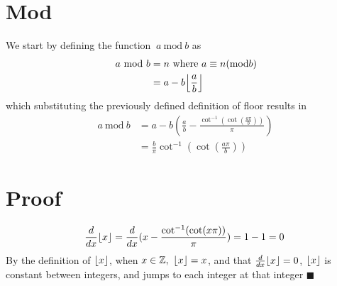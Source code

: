 \documentclass[11pt]{article}
\DeclarePairedDelimiter\floor{\lfloor}{\rfloor}
\newcommand{\Mod}[2]{\ #1\ \mathrm{mod}\ #2}
\newcommand{\fractionalAlg}{\frac{\cot^{\mathrm{-1}}(\cot(x\pi))}{\pi}}
\begin{document}
\section{Mod}
We start by defining the function \(\Mod{a}{b}\) as
\begin{align*}
\Mod{a}{b} &=n \textrm{ where } a \equiv n (\textrm{mod} b)\\
&=a-b\floor*{\frac{a}{b}}
\end{align*}
which substituting the previously defined definition of floor results in
\begin{equation*}
\begin{split}
\Mod{a}{b}&=a-b(\frac{a}{b}-\frac{\cot^{\mathrm{-1}}(\cot(\frac{a\pi}{b}))}{\pi})
\\&=\frac{b}{\pi}\cot^{\mathrm{-1}}(\cot(\frac{a\pi}{b}))
\end{split}
\end{equation*}
\section{Proof}
\begin{equation}
\frac{d}{dx} \floor{x}=\frac{d}{dx} (x-\fractionalAlg)=1-1=0
\end{equation}
By the definition of \(\floor{x}\), when \(x\in\mathbb{Z},\ \floor{x}=x\), and that \(\frac{d}{dx}\floor{x}=0\), \(\floor{x}\) is constant between integers, and jumps to each integer at that integer \(\blacksquare\)
\end{document}
